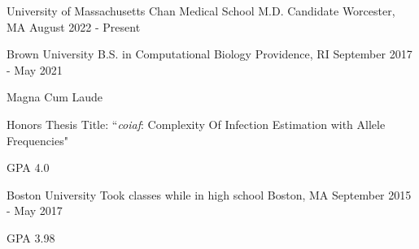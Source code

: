 
\begin{cventries}

  \cventry
  {University of Massachusetts Chan Medical School} %
  {M.D. Candidate} %
  {Worcester, MA} %
  {August 2022 - Present} %
  {}

  \cventry
  {Brown University} %
  {B.S. in Computational Biology} %
  {Providence, RI} %
  {September 2017 - May 2021} %
  {
    \begin{cvitems}
    \item {Magna Cum Laude}
    \item{Honors Thesis Title: ``\textit{coiaf}: Complexity Of Infection
      Estimation with Allele Frequencies"}
    \item {GPA 4.0}
    \end{cvitems}
  }

  \cventry
  {Boston University} %
  {Took classes while in high school} %
  {Boston, MA} %
  {September 2015 - May 2017} %
  {
    \begin{cvitems}
    \item {GPA 3.98}
    \end{cvitems}
  }

\end{cventries}
